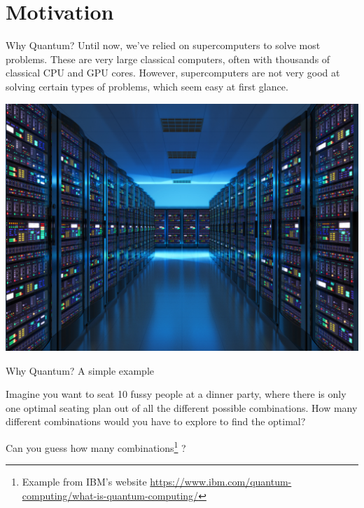 \graphicspath{{assets/motivation/}}

\section[Motivation]{Motivation}

\begin{frame}{Why Quantum?}
	Until now, we’ve relied on supercomputers to solve most problems. These are very large classical computers, often with thousands of classical CPU and GPU cores. However, supercomputers are not very good at solving certain types of problems, which seem easy at first glance. 
	
	\begin{center}
	    \includegraphics[width=.75\linewidth, height=.55\textheight]{server-room}
	\end{center}
\end{frame}

\begin{frame}{Why Quantum? A simple example}
	
Imagine you want to seat 10 fussy people at a dinner party, where there is only one optimal seating plan out of all the different possible combinations. How many different combinations would you have to explore to find the optimal?

Can you guess how many \alert{combinations}\footnote{Example from IBM's website \url{https://www.ibm.com/quantum-computing/what-is-quantum-computing/}} ?
\end{frame}



